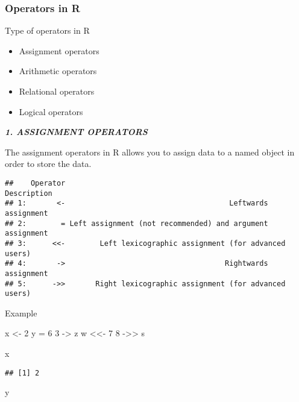 \documentclass[
]{article}
\newenvironment{Shaded}{\begin{snugshade}}{\end{snugshade}}
\newcommand{\DecValTok}[1]{\textcolor[rgb]{0.00,0.00,0.81}{#1}}
\newcommand{\NormalTok}[1]{#1}
\newcommand{\OtherTok}[1]{\textcolor[rgb]{0.56,0.35,0.01}{#1}}
\providecommand{\tightlist}{%
  \setlength{\itemsep}{0pt}\setlength{\parskip}{0pt}}
\begin{document}
\hypertarget{operators-in-r-1}{%
\subsubsection{Operators in R}\label{operators-in-r-1}}

Type of operators in R

\begin{itemize}
\tightlist
\item
  Assignment operators
\item
  Arithmetic operators
\item
  Relational operators
\item
  Logical operators
\end{itemize}

\textbf{\emph{1. ASSIGNMENT OPERATORS}}

The assignment operators in R allows you to assign data to a named
object in order to store the data.

\begin{verbatim}
##    Operator                                               Description
## 1:       <-                                      Leftwards assignment
## 2:        = Left assignment (not recommended) and argument assignment
## 3:      <<-        Left lexicographic assignment (for advanced users)
## 4:       ->                                     Rightwards assignment
## 5:      ->>       Right lexicographic assignment (for advanced users)
\end{verbatim}

Example

\begin{Shaded}
\begin{Highlighting}[]
\NormalTok{x }\OtherTok{\textless{}{-}} \DecValTok{2}
\NormalTok{y }\OtherTok{=} \DecValTok{6}
\DecValTok{3} \OtherTok{{-}\textgreater{}}\NormalTok{ z}
\NormalTok{w }\OtherTok{\textless{}\textless{}{-}} \DecValTok{7}
\DecValTok{8} \OtherTok{{-}\textgreater{}\textgreater{}}\NormalTok{ s}

\NormalTok{x}
\end{Highlighting}
\end{Shaded}

\begin{verbatim}
## [1] 2
\end{verbatim}

\begin{Shaded}
\begin{Highlighting}[]
\NormalTok{y}
\end{Highlighting}
\end{Shaded}
\end{document}
